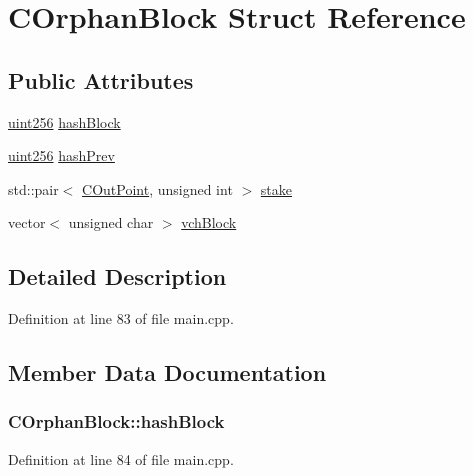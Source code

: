 \hypertarget{struct_c_orphan_block}{}\section{C\+Orphan\+Block Struct Reference}
\label{struct_c_orphan_block}
\subsection*{Public Attributes}
\begin{DoxyCompactItemize}
\item 
\hyperlink{classuint256}{uint256} \hyperlink{struct_c_orphan_block_ab4d0e535f5020a6c765ce3e1d58b5cb8}{hash\+Block}
\item 
\hyperlink{classuint256}{uint256} \hyperlink{struct_c_orphan_block_a8c6e5d47d1da746d59feefdc0eb9f55c}{hash\+Prev}
\item 
std\+::pair$<$ \hyperlink{class_c_out_point}{C\+Out\+Point}, unsigned int $>$ \hyperlink{struct_c_orphan_block_a11bf8c661061349166e335ba0dedd7fb}{stake}
\item 
vector$<$ unsigned char $>$ \hyperlink{struct_c_orphan_block_a6d63003bce14214976acc149cd4813e8}{vch\+Block}
\end{DoxyCompactItemize}


\subsection{Detailed Description}


Definition at line 83 of file main.\+cpp.



\subsection{Member Data Documentation}
\hypertarget{struct_c_orphan_block_ab4d0e535f5020a6c765ce3e1d58b5cb8}{}
\subsubsection[{hash\+Block}]{ C\+Orphan\+Block\+::hash\+Block}\label{struct_c_orphan_block_ab4d0e535f5020a6c765ce3e1d58b5cb8}


Definition at line 84 of file main.\+cpp.

\hypertarget{struct_c_orphan_block_a8c6e5d47d1da746d59feefdc0eb9f55c}{}
